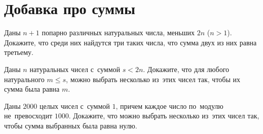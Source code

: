 

\section*{Добавка про суммы}



\begin{problems}

\item
Даны $n + 1$ попарно различных натуральных числа, меньших $2 n$ ($n > 1$).
Докажите, что среди них найдутся три таких числа, что сумма двух из них равна
третьему.

\item
Даны $n$ натуральных чисел с~суммой $s < 2 n$.
Докажите, что для любого натурального $m \leq s$, можно выбрать несколько
из~этих чисел так, чтобы их сумма была равна $m$.

\item
Даны $2000$ целых чисел с~суммой $1$, причем каждое число по~модулю
не~превосходит $1000$.
Докажите, что можно выбрать несколько из~этих чисел так, чтобы сумма выбранных
была равна нулю.

\end{problems}

